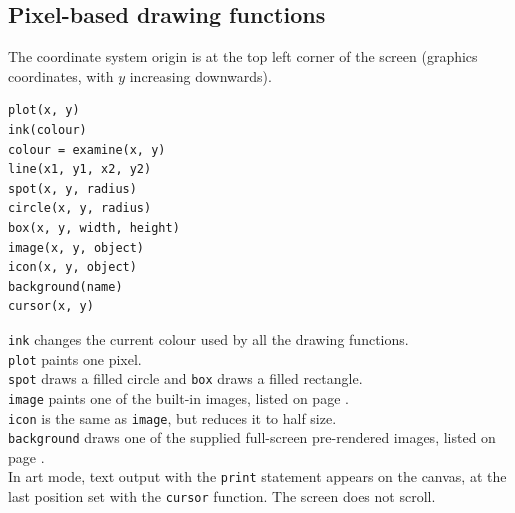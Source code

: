 \documentclass[12pt,a4paper,twoside]{article}
\renewcommand{\_}{\texttt{\symbol{95}}}
\begin{document}
% 
% 
% 
% 
% 

\subsection{Pixel-based drawing functions}

The coordinate system origin is at the top left corner of the
screen (graphics coordinates, with $y$ increasing downwards).

\begin{verbatim}
plot(x, y)
ink(colour)
colour = examine(x, y)
line(x1, y1, x2, y2)
spot(x, y, radius)
circle(x, y, radius)
box(x, y, width, height)
image(x, y, object)
icon(x, y, object)
background(name)
cursor(x, y)
\end{verbatim}

\verb^ink^ changes the current colour used by all the drawing
functions. \\
\verb^plot^ paints one pixel.\\
\verb^spot^ draws a filled circle and \verb^box^ draws a filled rectangle.\\
\verb^image^ paints one of the built-in images, listed on page
	\pageref{images}.\\
\verb^icon^ is the same as \verb^image^, but reduces it to half size.\\
\verb^background^ draws one of the supplied full-screen pre-rendered images,
	listed on page \pageref{backgrounds}.\\

In art mode, text output with the \verb^print^ statement appears on the
canvas, at the last position set with the \verb^cursor^ function.
The screen does not scroll.
\end{document}
